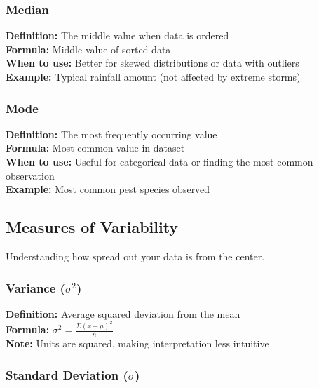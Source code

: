 \documentclass[11pt,a4paper]{article}
\begin{document}
\subsubsection{Median}

\begin{formulabox}
\textbf{Definition:} The middle value when data is ordered\\[0.3cm]
\textbf{Formula:} Middle value of sorted data\\[0.3cm]
\textbf{When to use:} Better for skewed distributions or data with outliers\\
\textbf{Example:} Typical rainfall amount (not affected by extreme storms)
\end{formulabox}

\subsubsection{Mode}

\begin{formulabox}
\textbf{Definition:} The most frequently occurring value\\[0.3cm]
\textbf{Formula:} Most common value in dataset\\[0.3cm]
\textbf{When to use:} Useful for categorical data or finding the most common observation\\
\textbf{Example:} Most common pest species observed
\end{formulabox}

\subsection{Measures of Variability}

Understanding how spread out your data is from the center.

\subsubsection{Variance ($\sigma^2$)}

\begin{formulabox}
\textbf{Definition:} Average squared deviation from the mean\\[0.3cm]
\textbf{Formula:} $\sigma^2 = \frac{\Sigma(x - \mu)^2}{n}$\\[0.3cm]
\textbf{Note:} Units are squared, making interpretation less intuitive
\end{formulabox}

\subsubsection{Standard Deviation ($\sigma$)}
\end{document}
